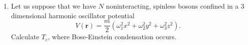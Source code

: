 \documentclass[11pt, a4paper]{article}
\begin{document}
\begin{enumerate}
    \item Let us suppose that we have $N$ noninteracting, spinless bosons confined in a
    3 dimensional harmonic oscillator potential
    \begin{equation*}
        V(\mathbf{r}) = \frac{m}{2}(\omega_1^2x^2 + \omega_2^2y^2 + \omega_3^2z^2).
    \end{equation*}
    Calculate $T_c$, where Bose-Einstein condensation occurs.
\end{enumerate}
\end{document}
